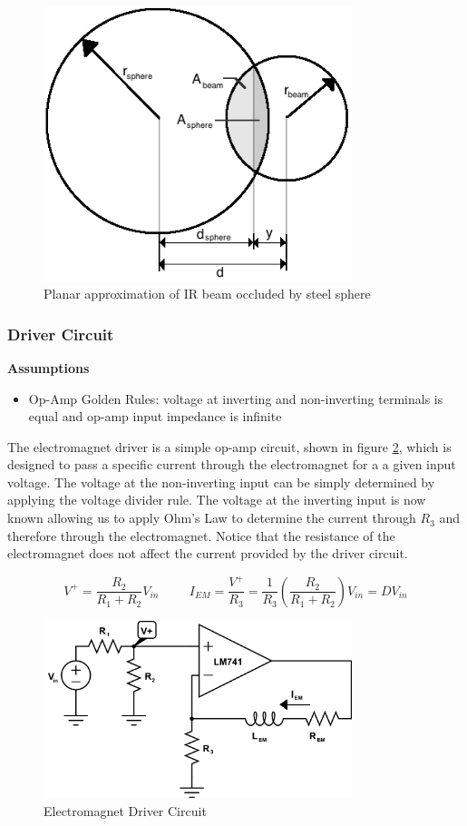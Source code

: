 \documentclass{article}
\theoremstyle{plain}
\theoremstyle{definition}
\theoremstyle{remark}
\begin{document}
\begin{figure}
\begin{center}
\includegraphics[width = 9cm]{beam_sphere_diagram.png}
\caption{Planar approximation of IR beam occluded by steel sphere}
\label{Q1_a1}
\end{center}
\end{figure}

\subsubsection*{Driver Circuit}
\textbf{Assumptions}
\begin{itemize}
\item Op-Amp Golden Rules: voltage at inverting and non-inverting terminals is equal and op-amp input impedance is infinite
\end{itemize}

The electromagnet driver is a simple op-amp circuit, shown in figure \ref{Q1_a2}, which is designed to pass a specific current through the electromagnet for a a given input voltage.  The voltage at the non-inverting input can be simply determined by applying the voltage divider rule.  The voltage at the inverting input is now known allowing us to apply Ohm's Law to determine the current through $R_{3}$ and therefore through the electromagnet.  Notice that the resistance of the electromagnet does not affect the current provided by the driver circuit.

$$ V^{+}=\frac{R_2}{R_1+R_2}V_{in} \hspace{1cm} I_{EM}=\frac{V^{+}}{R_3}=\frac{1}{R_3}\left(\frac{R_2}{R_1+R_2}\right)V_{in} = DV_{in}$$

\begin{figure}
\begin{center}
\includegraphics[width = 9cm]{em_driver_circuit.png}
\caption{Electromagnet Driver Circuit}
\label{Q1_a2}
\end{center}
\end{figure}
\end{document}

